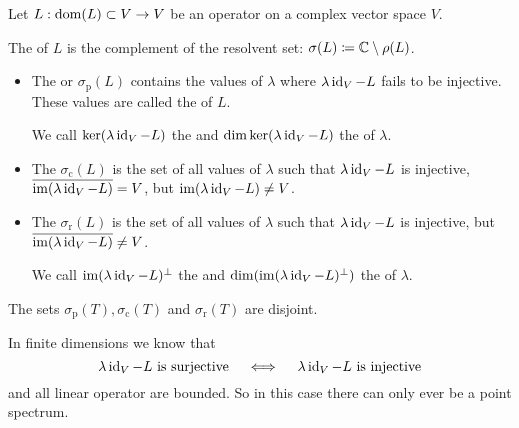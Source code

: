 \begin{definition}
Let $L: \operatorname{dom}(L)\subset V \to V$ be an operator on a complex vector space $V$.

The  of $L$ is the complement of the resolvent set: $\sigma(L) \coloneqq \mathbb{C}\setminus\rho(L)$.
\begin{itemize}
\item The  or  $\sigma_\text{p}(L)$ contains the values of $\lambda$ where $\lambda \operatorname{id}_V - L$ fails to be injective. These values are called the  of $L$.

We call $\ker(\lambda \operatorname{id}_V - L)$ the  and $\dim\ker(\lambda \operatorname{id}_V - L)$ the  of $\lambda$.
\item The  $\sigma_\text{c}(L)$ is the set of all values of $\lambda$ such that $\lambda \operatorname{id}_V - L$ is injective, $\overline{\operatorname{im}(\lambda \operatorname{id}_V - L)} = V$, but $\operatorname{im}(\lambda \operatorname{id}_V - L) \neq V$.
\item The  $\sigma_\text{r}(L)$ is the set of all values of $\lambda$ such that $\lambda \operatorname{id}_V - L$ is injective, but $\overline{\operatorname{im}(\lambda \operatorname{id}_V - L)} \neq V$.

We call $\operatorname{im}(\lambda \operatorname{id}_V - L)^\perp$ the  and $\dim(\operatorname{im}(\lambda \operatorname{id}_V - L)^\perp)$ the  of $\lambda$.
\end{itemize}
The sets $\sigma_\text{p}(T), \sigma_\text{c}(T)$ and $\sigma_\text{r}(T)$ are disjoint.
\end{definition}
In finite dimensions we know that
\[ \text{$\lambda \operatorname{id}_V - L$ is surjective} \quad\iff\quad \text{$\lambda \operatorname{id}_V - L$ is injective} \]
and all linear operator are bounded.
So in this case there can only ever be a point spectrum.

